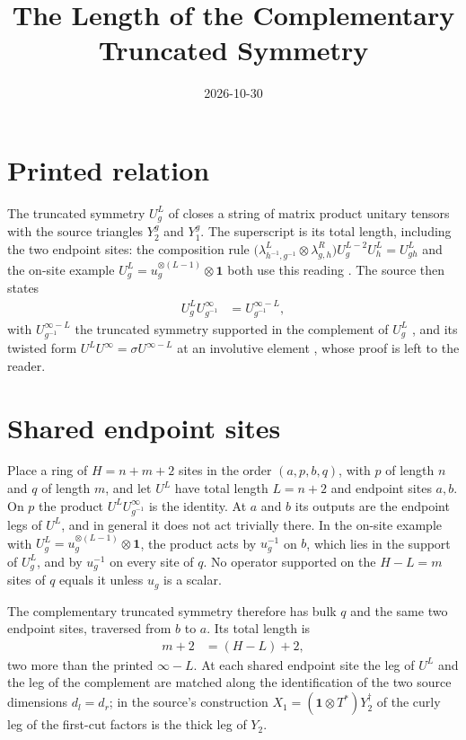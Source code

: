 \documentclass{article}
\title{The Length of the Complementary Truncated Symmetry}
\author{}
\date{2026-10-30}
\begin{document}
\maketitle
{}

\section{Printed relation}

The truncated symmetry \(U^L_g\) of  closes a
string of matrix product unitary tensors with the source triangles \(Y_2^g\)
and \(Y_1^g\). The superscript is its total length, including the two endpoint
sites: the composition rule
\(\bigl(\lambda^L_{h^{-1},g^{-1}}\otimes\lambda^R_{g,h}\bigr)U^{L-2}_gU^L_h
=U^L_{gh}\) and the on-site example
\(U^L_g=u_g^{\otimes(L-1)}\otimes\mathbf 1\) both use this reading
\cite[lines~3672 and 5622]{FrancoRubio2025MPUGauging}. The source then states
\begin{align}
    U^L_gU^\infty_{g^{-1}} & =U^{\infty-L}_{g^{-1}},
    \label{eq:fbc25_complementary_printed}
\end{align}
with \(U^{\infty-L}_{g^{-1}}\) the truncated symmetry supported in the
complement of \(U^L_g\) \cite[lines~2175--2181]{FrancoRubio2025MPUGauging}, and
its twisted form \(U^LU^\infty=\sigma U^{\infty-L}\) at an involutive element
\cite[lines~5344--5348]{FrancoRubio2025MPUGauging}, whose proof is left to the
reader.

\section{Shared endpoint sites}

Place a ring of \(H=n+m+2\) sites in the order \((a,p,b,q)\), with \(p\) of
length \(n\) and \(q\) of length \(m\), and let \(U^L\) have total length
\(L=n+2\) and endpoint sites \(a,b\). On \(p\) the product
\(U^LU^\infty_{g^{-1}}\) is the identity. At \(a\) and \(b\) its outputs are
the endpoint legs of \(U^L\), and in general it does not act trivially there.
In the on-site example with \(U^L_g=u_g^{\otimes(L-1)}\otimes\mathbf 1\), the
product acts by \(u_g^{-1}\) on \(b\), which lies in the support of \(U^L_g\),
and by \(u_g^{-1}\) on every site of \(q\). No operator supported on the
\(H-L=m\) sites of \(q\) equals it unless \(u_g\) is a scalar.

The complementary truncated symmetry therefore has bulk \(q\) and the same two
endpoint sites, traversed from \(b\) to \(a\). Its total length is
\begin{align}
    m+2 & =(H-L)+2,
    \label{eq:fbc25_complementary_length}
\end{align}
two more than the printed \(\infty-L\). At each shared endpoint site the leg of
\(U^L\) and the leg of the complement are matched along the identification of
the two source dimensions \(d_l=d_r\); in the source's construction
\(X_1=(\mathbf 1\otimes T^*)Y_2^\dagger\) of  the
curly leg of the first-cut factors is the thick leg of \(Y_2\).
\end{document}
